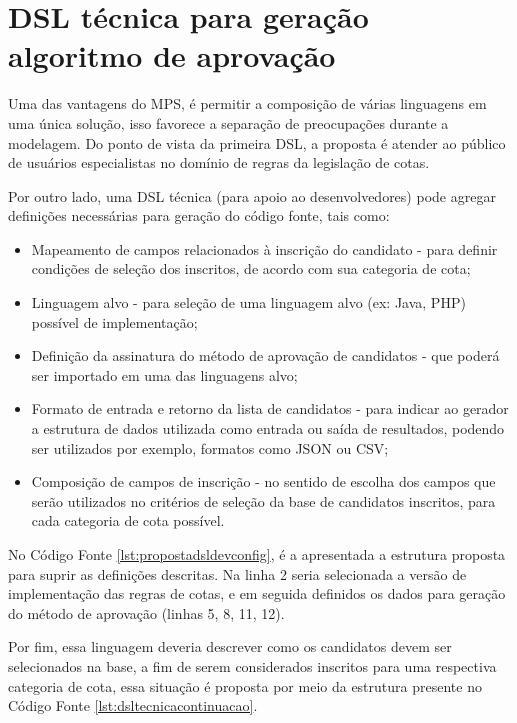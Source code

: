 \section{DSL técnica para geração algoritmo de aprovação}
\label{sec:dslproposta:dev}

 Uma das vantagens do \gls{MPS}, é permitir a composição de várias linguagens em uma única solução, isso favorece a separação de preocupações durante a modelagem. Do ponto de vista da primeira \gls{DSL}, a proposta é atender ao público de usuários especialistas no domínio de regras da legislação de cotas. 
 
 Por outro lado, uma \gls{DSL} técnica (para apoio ao desenvolvedores) pode agregar definições necessárias para geração do código fonte, tais como:
 
 \begin{itemize}
     \item Mapeamento de campos relacionados à inscrição do candidato - para definir condições de seleção dos inscritos, de acordo com sua categoria de cota;
     \item Linguagem alvo - para seleção de uma linguagem alvo (ex: Java, PHP) possível de implementação;
     \item Definição da assinatura do método de aprovação de candidatos - que poderá ser importado em uma das linguagens alvo;
     \item Formato de entrada e retorno da lista de candidatos - para indicar ao gerador a estrutura de dados utilizada como entrada ou saída de resultados, podendo ser utilizados por exemplo, formatos como JSON ou CSV;
     \item Composição de campos de inscrição - no sentido de escolha dos campos que serão utilizados no critérios de seleção da base de candidatos inscritos, para cada categoria de cota possível.
 \end{itemize}
 
    No Código Fonte \ref{lst:propostadsldevconfig}, é a apresentada a estrutura proposta para suprir as definições descritas. Na linha 2 seria selecionada a versão de implementação das regras de cotas, e em seguida definidos os dados para geração do método de aprovação (linhas 5, 8, 11, 12). 
    
    
 
 Por fim, essa linguagem deveria descrever como os candidatos devem ser selecionados na base, a fim de serem considerados inscritos para uma respectiva categoria de cota, essa situação é proposta por meio da estrutura presente no Código Fonte \ref{lst:dsltecnicacontinuacao}.
 
